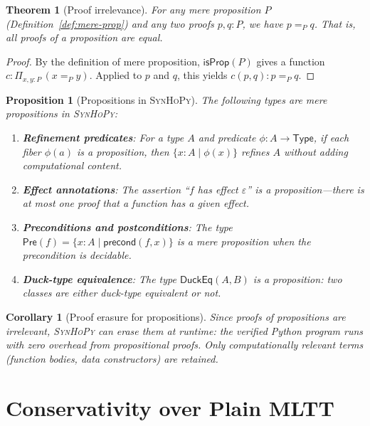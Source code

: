 \documentclass[11pt,a4paper]{report}
\theoremstyle{definition}
\theoremstyle{plain}
\newtheorem{theorem}[definition]{Theorem}
\newtheorem{proposition}[definition]{Proposition}
\newtheorem{corollary}[definition]{Corollary}
\newcommand{\Type}{\mathsf{Type}}
\newcommand{\DuckEq}{\mathsf{DuckEq}}
\newcommand{\Pre}{\mathsf{Pre}}
\newcommand{\synhopy}{\textsc{SynHoPy}}
\begin{document}
\begin{theorem}[Proof irrelevance]
\label{thm:proof-irrelevance}
For any mere proposition $P$ (Definition~\ref{def:mere-prop}) and any two
proofs $p, q : P$, we have $p =_P q$.  That is, all proofs of a proposition
are equal.
\end{theorem}
\begin{proof}
By the definition of mere proposition, $\mathsf{isProp}(P)$ gives a function
$c : \Pi_{x,y:P}\, (x =_P y)$.  Applied to $p$ and $q$, this yields
$c(p, q) : p =_P q$.
\end{proof}

\begin{proposition}[Propositions in \synhopy{}]
\label{prop:synhopy-props}
The following types are mere propositions in \synhopy{}:
\begin{enumerate}
  \item \textbf{Refinement predicates}: For a type $A$ and predicate $\phi : A \to \Type$,
    if each fiber $\phi(a)$ is a proposition, then $\{x : A \mid \phi(x)\}$ refines
    $A$ without adding computational content.
  \item \textbf{Effect annotations}: The assertion ``$f$ has effect $\varepsilon$''
    is a proposition---there is at most one proof that a function has a given effect.
  \item \textbf{Preconditions and postconditions}: The type
    $\Pre(f) = \{x : A \mid \mathsf{precond}(f, x)\}$ is a mere proposition
    when the precondition is decidable.
  \item \textbf{Duck-type equivalence}: The type $\DuckEq(A, B)$ is a
    proposition: two classes are either duck-type equivalent or not.
\end{enumerate}
\end{proposition}

\begin{corollary}[Proof erasure for propositions]
Since proofs of propositions are irrelevant, \synhopy{} can erase them at
runtime: the verified Python program runs with zero overhead from propositional
proofs.  Only computationally relevant terms (function bodies, data
constructors) are retained.
\end{corollary}


\section{Conservativity over Plain MLTT}
\end{document}
